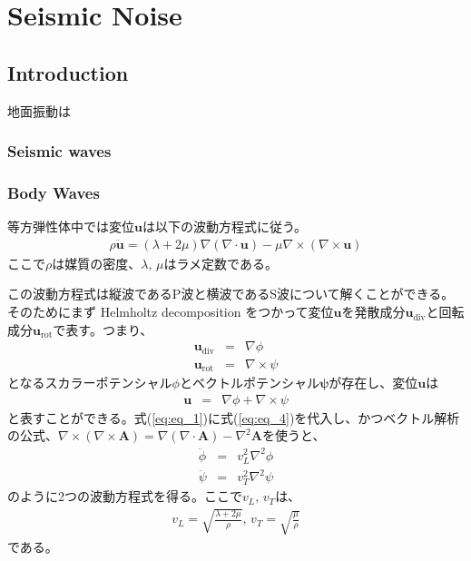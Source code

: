 \chapter{Seismic Noise}

\section{Introduction}
地面振動は


\subsection{Seismic waves}
\subsection{Body Waves}
等方弾性体中では変位$\bm{u}$は以下の波動方程式に従う。
\begin{eqnarray}\label{eq:eq_1}
  \rho{\bm{\ddot{u}}} = (\lambda+2\mu)\nabla(\nabla\cdot\bm{u}) - \mu\nabla\times(\nabla\times\bm{u})
\end{eqnarray}
ここで$\rho$は媒質の密度、$\lambda,\,\mu$はラメ定数である。

この波動方程式は縦波であるP波と横波であるS波について解くことができる。そのためにまず Helmholtz decomposition をつかって変位$\bm{u}$を発散成分$\bm{u}_{\mathrm{div}}$と回転成分$\bm{u}_{\mathrm{rot}}$で表す。つまり、
\begin{eqnarray}
  \bm{u}_{\mathrm{div}}&=&\nabla\phi \label{eq:eq_2}\\
  \bm{u}_{\mathrm{rot}}&=&\nabla\times\psi \label{eq:eq_3}
\end{eqnarray}
となるスカラーポテンシャル$\phi$とベクトルポテンシャル$\bm{\psi}$が存在し、変位$\bm{u}$は
\begin{eqnarray} 
  \bm{u} &=& \nabla\phi + \nabla\times\psi \label{eq:eq_4}
\end{eqnarray}
と表すことができる。式(\ref{eq:eq_1})に式(\ref{eq:eq_4})を代入し、かつベクトル解析の公式、$\nabla\times(\nabla\times\bm{A})=\nabla(\nabla\cdot\bm{A})-\nabla^2{\bm{A}}$を使うと、
\begin{eqnarray}
  \ddot{\phi} &=& v_{L}^2\nabla^2\phi \label{eq:eq_5}\\
  \ddot{\psi} &=& v_{T}^2\nabla^2\psi \label{eq:eq_6}
\end{eqnarray} 
のように2つの波動方程式を得る。ここで$v_{L},\,v_{T}$は、
\begin{eqnarray}
  v_{L} = \sqrt{\frac{\lambda+2\mu}{\rho}},\,v_{T} = \sqrt{\frac{\mu}{\rho}} \label{eq:eq_7}
\end{eqnarray} 
である。

